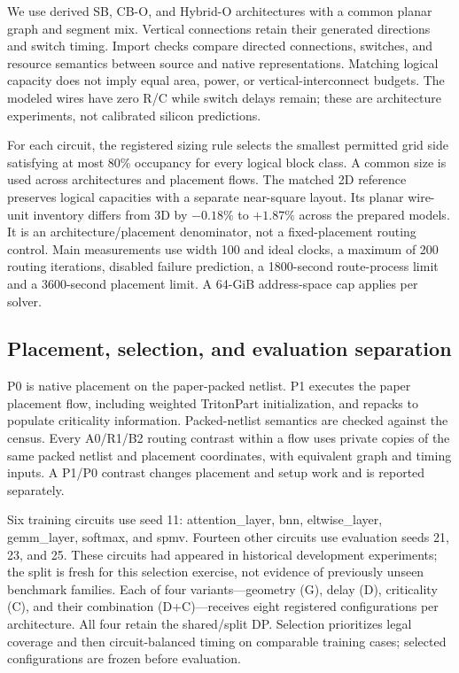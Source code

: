 \documentclass[conference,10pt]{IEEEtran}
\begin{document}
We use derived SB, CB-O, and Hybrid-O architectures with a common planar graph and segment mix. Vertical connections retain their generated directions and switch timing. Import checks compare directed connections, switches, and resource semantics between source and native representations. Matching logical capacity does not imply equal area, power, or vertical-interconnect budgets. The modeled wires have zero R/C while switch delays remain; these are architecture experiments, not calibrated silicon predictions.

For each circuit, the registered sizing rule selects the smallest permitted grid side satisfying at most 80\% occupancy for every logical block class. A common size is used across architectures and placement flows. The matched 2D reference preserves logical capacities with a separate near-square layout. Its planar wire-unit inventory differs from 3D by $-0.18\%$ to $+1.87\%$ across the prepared models. It is an architecture/placement denominator, not a fixed-placement routing control. Main measurements use width 100 and ideal clocks, a maximum of 200 routing iterations, disabled failure prediction, a 1800-second route-process limit and a 3600-second placement limit. A 64-GiB address-space cap applies per solver.

\subsection{Placement, selection, and evaluation separation}
P0 is native placement on the paper-packed netlist. P1 executes the paper placement flow, including weighted TritonPart initialization, and repacks to populate criticality information. Packed-netlist semantics are checked against the census. Every A0/R1/B2 routing contrast within a flow uses private copies of the same packed netlist and placement coordinates, with equivalent graph and timing inputs. A P1/P0 contrast changes placement and setup work and is reported separately.

Six training circuits use seed 11: attention\_layer, bnn, eltwise\_layer, gemm\_layer, softmax, and spmv. Fourteen other circuits use evaluation seeds 21, 23, and 25. These circuits had appeared in historical development experiments; the split is fresh for this selection exercise, not evidence of previously unseen benchmark families. Each of four variants---geometry (G), delay (D), criticality (C), and their combination (D+C)---receives eight registered configurations per architecture. All four retain the shared/split DP. Selection prioritizes legal coverage and then circuit-balanced timing on comparable training cases; selected configurations are frozen before evaluation.
\end{document}
